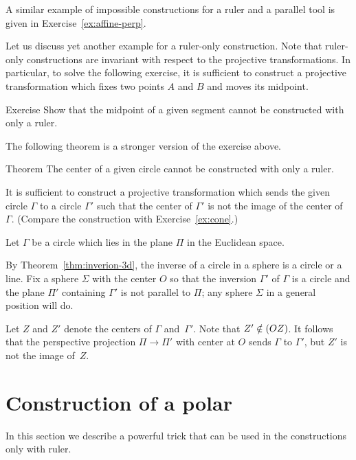 A similar example of impossible constructions for a ruler and a parallel tool
 is given in Exercise~\ref{ex:affine-perp}.
 
Let us discuss yet another example for a ruler-only construction.
Note that ruler-only constructions are invariant with respect to the projective transformations. 
In particular, to solve the following exercise, it is sufficient to construct a projective transformation which fixes two points $A$ and $B$ and moves its midpoint.

\begin{thm}{Exercise}\label{ex:midpoint-proj}
Show that the midpoint of a given segment cannot be constructed with only a ruler.
\end{thm}

The following theorem is a stronger version of the exercise above.

\begin{thm}{Theorem}\label{thm:circle-center-proj}
The center of a given circle cannot be constructed with only a ruler.
\end{thm}

It is sufficient to construct a projective transformation 
which sends the given circle $\Gamma$ to a circle $\Gamma'$ such that the center of $\Gamma'$ is not the image of the center of~$\Gamma$.
(Compare the construction with Exercise~\ref{ex:cone}.) 

Let $\Gamma$ be a circle which lies in the plane $\Pi$ in the Euclidean space.

By Theorem~\ref{thm:inverion-3d}, 
the inverse of a circle in a sphere is a circle or a line.
Fix a sphere $\Sigma$ with the center $O$ so that the inversion $\Gamma'$ of $\Gamma$
is a circle and the plane $\Pi'$ containing $\Gamma'$ is not parallel to $\Pi$;
any sphere $\Sigma$ in a general position will do.

Let $Z$ and $Z'$ denote the centers of $\Gamma$ and~$\Gamma'$.
Note that  $Z'\z\notin(OZ)$.
It follows that the perspective projection $\Pi\to \Pi'$ with center at $O$ sends $\Gamma$ to $\Gamma'$, but $Z'$ is not the image of~$Z$.
\qeds

\section*{Construction of a polar}

In this section we describe a powerful trick that can be used in the constructions only with ruler.

